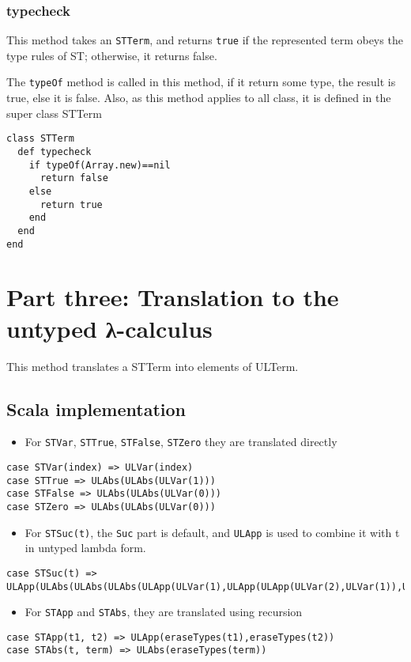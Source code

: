 \documentclass[11pt]{article}
\begin{document}
\subsubsection{typecheck}
\label{sec:orgb829cfc}
This method takes an \texttt{STTerm}, and returns \texttt{true} if the represented term obeys the type rules of ST; 
otherwise, it returns false.

The \texttt{typeOf} method is called in this method, if it return some type, the result is true, else it is false. 
Also, as this method applies to all class, it is defined in the super class STTerm
\begin{verbatim}
class STTerm 
  def typecheck
    if typeOf(Array.new)==nil
      return false
    else
      return true
    end
  end
end
\end{verbatim}


\section{Part three: Translation to the untyped λ-calculus}
\label{sec:org51cb0eb}
This method translates a STTerm into elements of ULTerm.

\subsection{Scala implementation}
\label{sec:org621452c}
\begin{itemize}
\item For \texttt{STVar}, \texttt{STTrue}, \texttt{STFalse}, \texttt{STZero} they are translated directly
\end{itemize}
\begin{verbatim}
case STVar(index) => ULVar(index)
case STTrue => ULAbs(ULAbs(ULVar(1)))
case STFalse => ULAbs(ULAbs(ULVar(0)))
case STZero => ULAbs(ULAbs(ULVar(0)))
\end{verbatim}

\begin{itemize}
\item For \texttt{STSuc(t)}, the \texttt{Suc} part is default, and \texttt{ULApp} is used to combine it with t in untyped lambda form.
\end{itemize}
\begin{verbatim}
case STSuc(t) => ULApp(ULAbs(ULAbs(ULAbs(ULApp(ULVar(1),ULApp(ULApp(ULVar(2),ULVar(1)),ULVar(0)))))),eraseTypes(t))
\end{verbatim}

\begin{itemize}
\item For \texttt{STApp} and \texttt{STAbs}, they are translated using recursion
\end{itemize}
\begin{verbatim}
case STApp(t1, t2) => ULApp(eraseTypes(t1),eraseTypes(t2))
case STAbs(t, term) => ULAbs(eraseTypes(term))
\end{verbatim}
\end{document}
